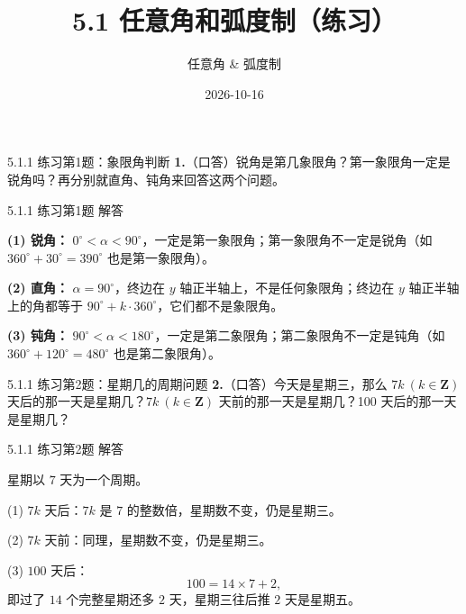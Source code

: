 \documentclass[10pt,aspectratio=169,serif]{beamer}
\title[5.1 任意角和弧度制练习]{5.1 任意角和弧度制（练习）}
\subtitle{任意角 \& 弧度制}
\author{}
\institute{}
\date{2026-10-16}
\begin{document}
\begin{frame}
  \titlepage
\end{frame}

\begin{frame}[t]{5.1.1 练习第1题：象限角判断}
\textbf{1.}（口答）锐角是第几象限角？第一象限角一定是锐角吗？再分别就直角、钝角来回答这两个问题。
\end{frame}

\begin{frame}[t]{5.1.1 练习第1题 解答}
\begin{tcolorbox}[colback=orange!10,colframe=orange,title=\textbf{解}]
\textbf{(1) 锐角：} $0^\circ<\alpha<90^\circ$，一定是\alert{第一象限角}；第一象限角\alert{不一定}是锐角（如 $360^\circ+30^\circ=390^\circ$ 也是第一象限角）。

\vspace{0.5em}
\textbf{(2) 直角：} $\alpha=90^\circ$，终边在 $y$ 轴正半轴上，\alert{不是任何象限角}；终边在 $y$ 轴正半轴上的角都等于 $90^\circ+k\cdot 360^\circ$，它们都不是象限角。

\vspace{0.5em}
\textbf{(3) 钝角：} $90^\circ<\alpha<180^\circ$，一定是\alert{第二象限角}；第二象限角\alert{不一定}是钝角（如 $360^\circ+120^\circ=480^\circ$ 也是第二象限角）。
\end{tcolorbox}
\end{frame}

\begin{frame}[t]{5.1.1 练习第2题：星期几的周期问题}
\textbf{2.}（口答）今天是星期三，那么 $7k\ (k\in\mathbf{Z})$ 天后的那一天是星期几？$7k\ (k\in\mathbf{Z})$ 天前的那一天是星期几？100 天后的那一天是星期几？
\end{frame}

\begin{frame}[t]{5.1.1 练习第2题 解答}
\begin{tcolorbox}[colback=orange!10,colframe=orange,title=\textbf{解}]
星期以 $7$ 天为一个周期。

\vspace{0.5em}
(1) $7k$ 天后：$7k$ 是 $7$ 的整数倍，星期数不变，仍是\alert{星期三}。

\vspace{0.5em}
(2) $7k$ 天前：同理，星期数不变，仍是\alert{星期三}。

\vspace{0.5em}
(3) $100$ 天后：
\[
100 = 14\times 7 + 2,
\]
即过了 $14$ 个完整星期还多 $2$ 天，星期三往后推 $2$ 天是\alert{星期五}。
\end{tcolorbox}
\end{frame}
\end{document}
